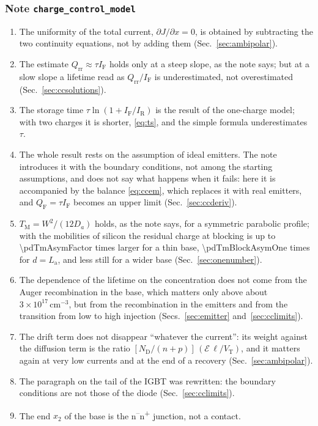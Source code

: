 \documentclass[10pt,a4paper]{scrartcl}
\newcommand{\IF}{I_\mathrm{F}}
\newcommand{\IR}{I_\mathrm{R}}
\newcommand{\Qrr}{Q_\mathrm{rr}}
\newcommand{\TM}{T_\mathrm{M}}
\newcommand{\VT}{V_\mathrm{T}}
\newcommand{\Ef}{\mathcal{E}}                 %
\newcommand{\ND}{N_\mathrm{D}}
\newcommand{\La}{L_\mathrm{a}}
\newcommand{\QF}{Q_\mathrm{F}}
\newcommand{\Nm}{n\textsuperscript{--}}
\newcommand{\Np}{n\textsuperscript{+}}
\newcommand{\cmc}{\si{\centi\metre^{-3}}}
\begin{document}
\subsubsection*{Note \texttt{charge\_control\_model}}
\begin{enumerate}
\item The uniformity of the total current, $\partial J/\partial x = 0$, is obtained by subtracting the two continuity equations, not by adding them (Sec.~\ref{sec:ambipolar}).
\item The estimate $\Qrr \approx \tau\IF$ holds only at a steep slope, as the note says; but at a slow slope a lifetime read as $\Qrr/\IF$ is underestimated, not overestimated (Sec.~\ref{sec:ccsolutions}).
\item The storage time $\tau\ln(1+\IF/\IR)$ is the result of the one-charge model; with two charges it is shorter, \eqref{eq:ts}, and the simple formula underestimates $\tau$.
\item The whole result rests on the assumption of ideal emitters. The note introduces it with the boundary conditions, not among the starting assumptions, and does not say what happens when it fails: here it is accompanied by the balance \eqref{eq:ccem}, which replaces it with real emitters, and $\QF = \tau\IF$ becomes an upper limit (Sec.~\ref{sec:ccderiv}).
\item $\TM = W^2/(12D_a)$ holds, as the note says, for a symmetric parabolic profile; with the mobilities of silicon the residual charge at blocking is up to \num{\pdTmAsymFactor} times larger for a thin base, \num{\pdTmBlockAsymOne} times for $d = \La$, and less still for a wider base (Sec.~\ref{sec:onenumber}).
\item The dependence of the lifetime on the concentration does not come from the Auger recombination in the base, which matters only above about $3\times10^{17}\,\cmc$, but from the recombination in the emitters and from the transition from low to high injection (Secs.~\ref{sec:emitter} and~\ref{sec:cclimits}).
\item The drift term does not disappear ``whatever the current'': its weight against the diffusion term is the ratio $[\ND/({n+p})]\,(\Ef\,\ell/\VT)$, and it matters again at very low currents and at the end of a recovery (Sec.~\ref{sec:ambipolar}).
\item The paragraph on the tail of the IGBT was rewritten: the boundary conditions are not those of the diode (Sec.~\ref{sec:cclimits}).
\item The end $x_2$ of the base is the \Nm\Np{} junction, not a contact.
\end{enumerate}
\end{document}
